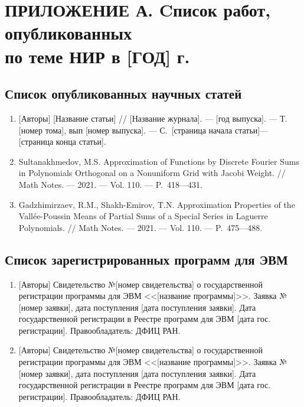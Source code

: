 \chapter{ПРИЛОЖЕНИЕ А. Cписок работ, опубликованных \texorpdfstring{\\ }{} по теме НИР в [ГОД] г.}


\section*{Список опубликованных научных статей}

\begin{enumerate}
    \item
    {[Авторы]}
    [Название статьи]
    //
    [Название журнала].
    --- [год выпуска].
    --- Т. [номер тома], вып [номер выпуска].
    --- С.~[страница начала статьи]---[страница конца статьи].

    \item
    \foreignlanguage{english}{%
        Sultanakhmedov, M.S.
        Approximation of Functions by Discrete Fourier Sums in Polynomials Orthogonal on a Nonuniform Grid with Jacobi Weight.
        //
        Math Notes. 
        --- 2021.
        --- Vol. 110.
        --- P.~418---431.
    }%

    \item
    \foreignlanguage{english}{%
        Gadzhimirzaev, R.M., Shakh-Emirov, T.N.
        Approximation Properties of the Vallée-Pous\-sin Means of Partial Sums of a Special Series in Laguerre Polynomials.
        //
        Math Notes. 
        --- 2021.
        --- Vol. 110.
        --- P.~475---488.
    }%

\end{enumerate}

\section*{Список зарегистрированных программ для ЭВМ}

\begin{enumerate}

    \item
    {[Авторы]} Свидетельство №[номер свидетельства] о государственной регистрации программы для ЭВМ <<[название программы]>>. Заявка №[номер заявки], дата поступления [дата поступления заявки]. Дата государственной регистрации в Реестре программ для ЭВМ [дата гос. регистрации]. Правообладатель: ДФИЦ РАН.

    \item
    {[Авторы]} Свидетельство №[номер свидетельства] о государственной регистрации программы для ЭВМ <<[название программы]>>. Заявка №[номер заявки], дата поступления [дата поступления заявки]. Дата государственной регистрации в Реестре программ для ЭВМ [дата гос. регистрации]. Правообладатель: ДФИЦ РАН.

\end{enumerate}
